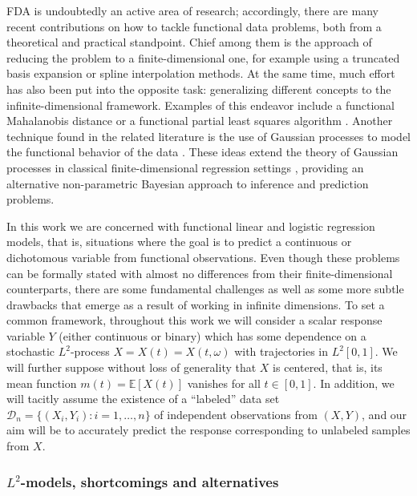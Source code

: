 \documentclass[ba]{imsart}
\numberwithin{equation}{section}
\theoremstyle{plain}
\newcommand{\E}{\mathbb{E}}
\begin{document}
FDA is undoubtedly an active area of research; accordingly, there are many recent contributions on how to tackle functional data problems, both from a theoretical and practical standpoint. Chief among them is the approach of reducing the problem to a finite-dimensional one, for example using a truncated basis expansion or spline interpolation methods. At the same time, much effort has also been put into the opposite task: generalizing different concepts to the infinite-dimensional framework. Examples of this endeavor include a functional Mahalanobis distance \citep{berrendero2020mahalanobis} or a functional partial least squares algorithm \citep{delaigle2012methodology}. Another technique found in the related literature is the use of Gaussian processes to model the functional behavior of the data \citep[see for instance][]{shi2011gaussian}. These ideas extend the theory of Gaussian processes in classical finite-dimensional regression settings \citep[e.g.][]{rasmussen2004gaussian}, providing an alternative non-parametric Bayesian approach to inference and prediction problems.

In this work we are concerned with functional linear and logistic regression models, that is, situations where the goal is to predict a continuous or dichotomous variable from functional observations. Even though these problems can be formally stated with almost no differences from their finite-dimensional counterparts, there are some fundamental challenges as well as some more subtle drawbacks that emerge as a result of working in infinite dimensions. To set a common framework, throughout this work we will consider a scalar response variable \(Y\) (either continuous or binary) which has some dependence on a stochastic \(L^2\)-process \(X=X(t)=X(t, \omega)\) with trajectories in \(L^2[0, 1]\). We will further suppose without loss of generality that \(X\) is centered, that is, its mean function \(m(t)=\E[X(t)]\) vanishes for all \(t\in[0,1]\). In addition, we will tacitly assume the existence of a ``labeled'' data set \(\mathcal D_n =\{(X_i, Y_i): i=1,\dots, n\}\) of independent observations from \((X, Y)\), and our aim will be to accurately predict the response corresponding to unlabeled samples from \(X\).

\subsubsection{\(L^2\)-models, shortcomings and alternatives}
\end{document}
